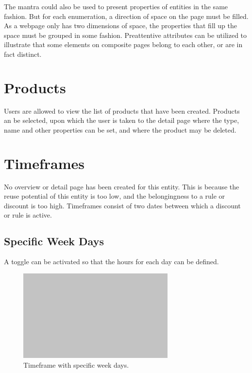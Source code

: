 The mantra could also be used to present properties of entities in the same fashion. But for each enumeration, a direction of space on the page must be filled. As a webpage only has two dimensions of space, the properties that fill up the space must be grouped in some fashion. Preattentive attributes can be utilized to illustrate that some elements on composite pages belong to each other, or are in fact distinct.

%
\section{Products}
Users are allowed to view the list of products that have been created. Products an be selected, upon which the user is taken to the detail page where the type, name and other properties can be set, and where the product may be deleted.

%
\section{Timeframes}
No overview or detail page has been created for this entity. This is because the reuse potential of this entity is too low, and the belongingness to a rule or discount is too high. Timeframes consist of two dates between which a discount or rule is active.

\subsection{Specific Week Days}
A toggle can be activated so that the hours for each day can be defined.

\begin{figure}[H]
	\centering
	\includegraphics[width=0.7\textwidth]{Blank}
	\caption[Timeframe Component]{Timeframe with specific week days.}
	\label{fig:Timeframe Component}
\end{figure}

